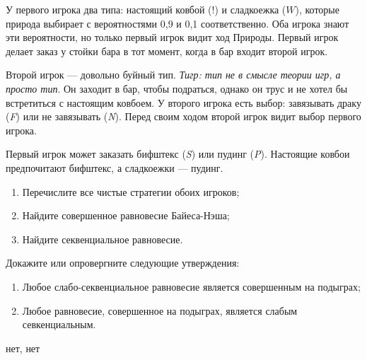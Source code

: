 \begin{problem}
{}
У первого игрока два типа: настоящий ковбой ($!$) и сладкоежка ($W$), которые природа выбирает с вероятностями 0,9 и 0,1 соответственно. Оба игрока знают эти вероятности, но только первый игрок видит ход Природы. Первый игрок делает заказ у стойки бара в тот момент, когда в бар входит второй игрок.\par


Второй игрок --- довольно буйный тип. {\it Тигр: тип не в смысле теории игр, а просто тип}. Он заходит в бар, чтобы подраться, однако он трус и не хотел бы встретиться с настоящим ковбоем. У второго игрока есть выбор: завязывать драку ({\it F}) или не завязывать ({\it N}). Перед своим ходом второй игрок видит выбор первого игрока.\par
Первый игрок может заказать бифштекс ({\it S}) или пудинг ({\it P}). Настоящие ковбои предпочитают бифштекс, а сладкоежки --- пудинг.
\begin{enumerate}
\item Перечислите все чистые стратегии обоих игроков;\par
\item Найдите совершенное равновесие Байеса-Нэша;\par
\item Найдите секвенциальное равновесие.\par
\end{enumerate}


\begin{sol}

\end{sol}
\end{problem}



\begin{problem}
Докажите или опровергните следующие утверждения:

\begin{enumerate}
\item Любое слабо-секвенциальное равновесие является совершенным на подыграх;\par
\item  Любое равновесие, совершенное на подыграх, является слабым севкенциальным.
\end{enumerate}

\begin{sol}
нет, нет
\end{sol}
\end{problem}





